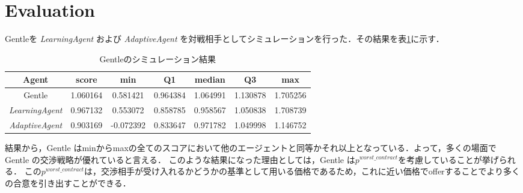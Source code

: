 \documentclass[uplatex, 10pt, a4j]{jsarticle}
\begin{document}
\section{\textrm{Evaluation}}
Gentleを \textit{LearningAgent} および \textit{AdaptiveAgent} を対戦相手としてシミュレーションを行った．その結果を表\ref{table:result}に示す．
\begin{table}[htbp]
    \caption{Gentleのシミュレーション結果}
    \label{table:result}
    \centering
    \begin{tabular}{ccccccc}
        \hline
        Agent                  & score    & min       & Q1       & median   & Q3       & max      \\
        \hline \hline
        Gentle                 & 1.060164 & 0.581421  & 0.964384 & 1.064991 & 1.130878 & 1.705256 \\
        \textit{LearningAgent} & 0.967132 & 0.553072  & 0.858785 & 0.958567 & 1.050838 & 1.708739 \\
        \textit{AdaptiveAgent} & 0.903169 & -0.072392 & 0.833647 & 0.971782 & 1.049998 & 1.146752 \\
        \hline
    \end{tabular}
\end{table}

結果から，Gentle はminからmaxの全てのスコアにおいて他のエージェントと同等かそれ以上となっている．よって，多くの場面で Gentle の交渉戦略が優れていると言える．
このような結果になった理由としては，Gentle は$p^{worst\_contract}$を考慮していることが挙げられる．
この$p^{worst\_contract}$は，交渉相手が受け入れるかどうかの基準として用いる価格であるため，これに近い価格でofferすることでより多くの合意を引き出すことができる．
\end{document}

